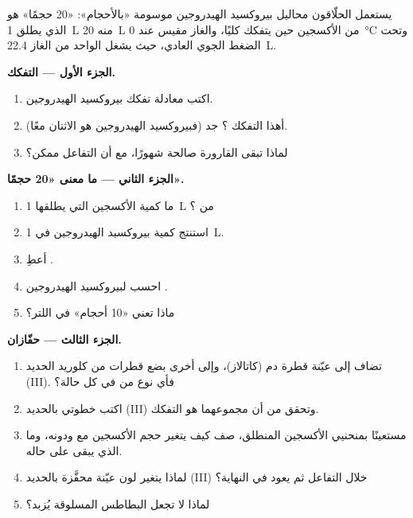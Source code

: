 \begin{problem}
\label{pb:g12:catalysis:1}
يستعمل الحلّاقون محاليل بيروكسيد الهيدروجين موسومة «بالأحجام»: 
«20 حجمًا» هو الذي يطلق \qty{1}{L} منه \qty{20}{L}
من الأكسجين حين يتفكك كليًا، والغاز مقيس عند
\qty{0}{\celsius} وتحت الضغط الجوي العادي، حيث يشغل  الواحد من الغاز
\qty{22.4}{L}.

\medskip
\noindent\textbf{الجزء الأول --- التفكك.}
\begin{enumerate}
  \item اكتب معادلة تفكك بيروكسيد الهيدروجين.
  \item أهذا التفكك ؟ جد 
         (فبيروكسيد الهيدروجين هو الاثنان معًا).
  \item لماذا تبقى القارورة صالحة شهورًا، مع أن التفاعل
        ممكن؟
\end{enumerate}

\medskip
\noindent\textbf{الجزء الثاني --- ما معنى «20 حجمًا».}
\begin{enumerate}[resume]
  \item ما كمية الأكسجين التي يطلقها \qty{1}{L} من ؟
  \item استنتج كمية بيروكسيد الهيدروجين في \qty{1}{L}.
  \item أعطِ .
  \item احسب  لبيروكسيد الهيدروجين .
  \item ماذا تعني «10 أحجام»  في اللتر؟
\end{enumerate}

\medskip
\noindent\textbf{الجزء الثالث --- حفّازان.}
\begin{enumerate}[resume]
  \item تضاف إلى عيّنة قطرة دم (كاتالاز)، وإلى أخرى بضع قطرات من كلوريد الحديد (III).
        فأي نوع من  في كل حالة؟
  \item اكتب خطوتي  بالحديد (III) وتحقق من أن
        مجموعهما هو التفكك.
  \item مستعينًا بمنحنيي الأكسجين المنطلق، صف كيف يتغير حجم
        الأكسجين مع  ودونه، وما الذي يبقى
        على حاله.
  \item لماذا يتغير لون عيّنة محفَّزة بالحديد (III) خلال
        التفاعل ثم يعود في النهاية؟
  \item لماذا لا تجعل البطاطس المسلوقة  يُزبد؟
\end{enumerate}


\end{problem}
